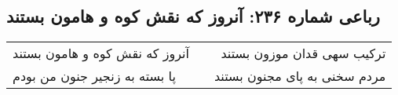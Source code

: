 \begin{center}
\section*{رباعی شماره ۲۳۶: آنروز که نقش کوه و هامون بستند}
\label{sec:sh236}
\begin{longtable}{l p{0.5cm} r}
آنروز که نقش کوه و هامون بستند
&&
ترکیب سهی قدان موزون بستند
\\
پا بسته به زنجیر جنون من بودم
&&
مردم سخنی به پای مجنون بستند
\\
\end{longtable}
\end{center}

